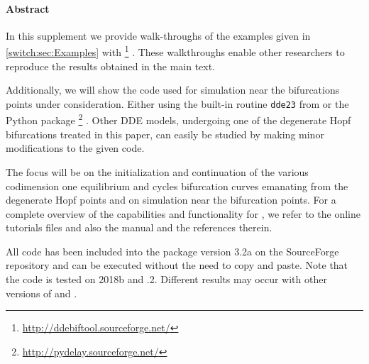 \paragraph{{\color{header1}Abstract}}
In this supplement we provide walk-throughs of the examples given in \cref{switch:sec:Examples} with \DDEBIFTOOL\footnote{\url{http://ddebiftool.sourceforge.net/}} \cite{DDEBIFTOOL}. These walkthroughs enable other researchers to reproduce the results obtained in the main text.

Additionally, we will show the code used for simulation near the bifurcations
points under consideration. Either using the built-in routine \lstinline|dde23|
from \MATLAB \cite{Shampine01solvingdelay} or the Python package
\PYDELAY\footnote{\url{http://pydelay.sourceforge.net/}}
\cite{Flunkert2009Flunkert}. Other DDE models, undergoing one of the degenerate
Hopf bifurcations treated in this paper, can easily be studied by making minor
modifications to the given code.

The focus will be on the initialization and continuation of the various codimension one equilibrium and cycles bifurcation curves emanating from the degenerate Hopf points and on simulation near the bifurcation points. For a complete overview of the capabilities and functionality for \DDEBIFTOOL, we refer to the online tutorials files and also the manual and the references therein.

All code has been included into the \DDEBIFTOOL package version 3.2a on the SourceForge repository and can be executed without the need to copy and paste. Note that the code is tested on \MATLAB 2018b and .2. Different results may occur with other versions of \MATLAB and \OCTAVE.

